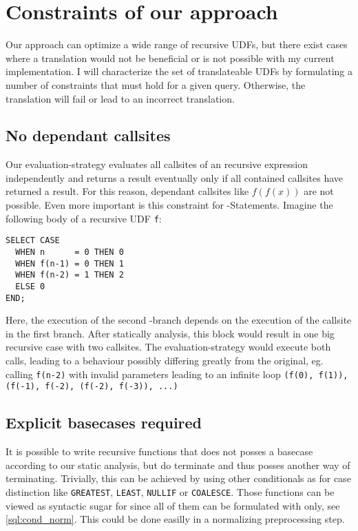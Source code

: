 
\section{Constraints of our approach}
Our approach can optimize a wide range of recursive UDFs, but there exist cases where a translation would not be beneficial or is not possible with my current implementation. I will characterize the set of translateable UDFs by formulating a number of constraints that must hold for a given query. Otherwise, the translation will fail or lead to an incorrect translation.
 
\subsection{No dependant callsites}
Our evaluation-strategy evaluates all callsites of an recursive expression independently and returns a result eventually only if all contained callsites have returned a result. For this reason, dependant callsites like $f(f(x))$ are not possible. Even more important is this constraint for \CASE-Statements. Imagine the following body of a recursive UDF \texttt{f}:
\begin{verbatim} 
SELECT CASE
  WHEN n      = 0 THEN 0
  WHEN f(n-1) = 0 THEN 1
  WHEN f(n-2) = 1 THEN 2
  ELSE 0
END;
\end{verbatim}
Here, the execution of the second \CASE-branch depends on the execution of the callsite in the first branch. After statically analysis, this block would result in one big recursive case with two callsites. The evaluation-strategy would execute both calls, leading to a behaviour possibly differing greatly from the original, eg. calling \texttt{f(n-2)} with invalid parameters leading to an infinite loop \texttt{(f(0), f(1)), (f(-1), f(-2), (f(-2), f(-3)), ...)}

\subsection{Explicit basecases required}
It is possible to write recursive functions that does not posses a basecase according to our static analysis, but do terminate and thus posses another way of terminating. Trivially, this can be achieved by using other conditionals as \CASE for case distinction like \texttt{GREATEST}, \texttt{LEAST}, \texttt{NULLIF} or \texttt{COALESCE}. Those functions can be viewed as syntactic sugar for \CASE since all of them can be formulated with \CASE only, see \ref{sql:cond_norm}. This could be done easilly in a normalizing preprocessing step.

